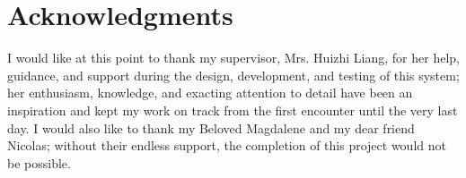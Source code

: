 \chapter*{\center \Large  Acknowledgments}

I would like at this point to thank my supervisor, Mrs. Huizhi Liang, for her help, guidance, and support during the design, development, and testing
of this system; her enthusiasm, knowledge, and exacting attention to detail have been an inspiration and kept my work on track from the first
encounter until the very last day. I would also like to thank my Beloved Magdalene and my dear friend Nicolas; without their endless support, the completion of this project 
would not be possible.

